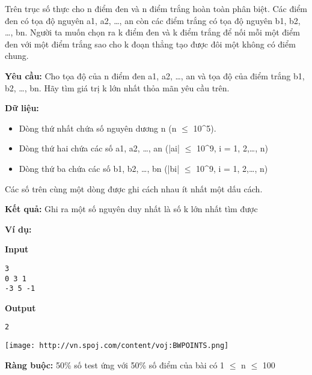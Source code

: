 

Trên trục số thực cho n điểm đen và n điểm trắng hoàn toàn phân biệt. Các điểm đen có tọa độ nguyên a1, a2, …, an còn các điểm trắng có tọa độ nguyên b1, b2, …, bn. Người ta muốn chọn ra k điểm đen và k điểm trắng để nối mỗi một điểm đen với một điểm trắng sao cho k đoạn thẳng tạo được đôi một không có điểm chung.

\textbf{Yêu cầu: } Cho tọa độ của n điểm đen a1, a2, …, an và tọa độ của điểm trắng b1, b2, …, bn. Hãy tìm giá trị k lớn nhất thỏa mãn yêu cầu trên.

\textbf{Dữ liệu: }
\begin{itemize}
	\item Dòng thứ nhất chứa số nguyên dương n (n  $\le$  10^5).
	\item Dòng thứ hai chứa các số a1, a2, …, an (|ai|  $\le$  10^9, i = 1, 2,…, n)
	\item Dòng thứ ba chứa các số b1, b2, …, bn (|bi|  $\le$  10^9, i = 1, 2,…, n)
\end{itemize}

Các số trên cùng một dòng được ghi cách nhau ít nhất một dấu cách.

\textbf{Kết quả: } Ghi ra một số nguyên duy nhất là số k lớn nhất tìm được

\textbf{Ví dụ: }

\textbf{Input}
\begin{verbatim}
3
0 3 1
-3 5 -1\end{verbatim}

\textbf{Output}
\begin{verbatim}
2\end{verbatim}


\texttt{[image: http://vn.spoj.com/content/voj:BWPOINTS.png]}

\textbf{Ràng buộc: } 50\% số test ứng với 50\% số điểm của bài có 1  $\le$  n  $\le$  100
